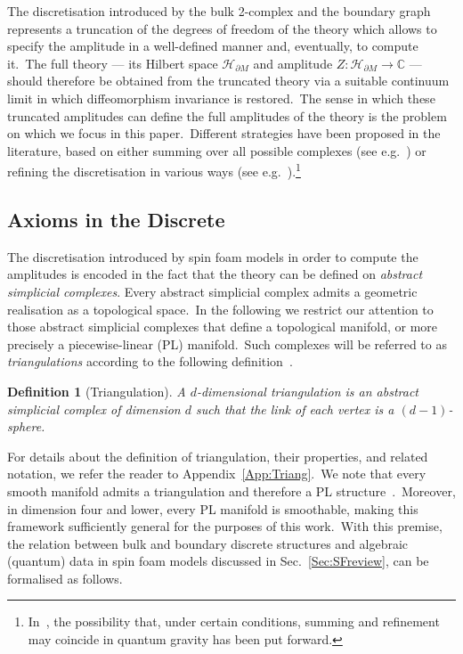 \documentclass[11pt]{article}
\newtheorem{definition}{Definition}[section]
\theoremstyle{definition}
\numberwithin{equation}{section}
\begin{document}
    \smallskip
    
    The discretisation introduced by the bulk 2-complex and the boundary graph represents a truncation of the degrees of freedom of the theory which allows to specify the amplitude in a well-defined manner and, eventually, to compute it.~The full theory --- its Hilbert space $\mathcal H_{\partial M}$ and amplitude $Z \colon \mathcal{H}_{\partial M} \to \mathbb{C}$ --- should therefore be obtained from the truncated theory via a suitable continuum limit in which diffeomorphism invariance is restored.~The sense in which these truncated amplitudes can define the full amplitudes of the theory is the problem on which we focus in this paper.~Different strategies have been proposed in the literature, based on either summing over all possible complexes (see e.g.~\cite{Reisenberger_Rovelli_1997,Reisenberger:2000fy,Oriti:2014yla,Han:2025emp}) or refining the discretisation in various ways (see e.g.~\cite{Rovelli:2011eq,Rovelli_Smerlak_2012, Dittrich:2012jq,Dittrich:2013xwa,Dittrich:2014ala,Asante_Dittrich_Steinhaus_2023,Rovelli_2022}).\footnote{In~\cite{Rovelli_Smerlak_2012}, the possibility that, under certain conditions, summing and refinement may coincide in quantum gravity has been put forward.}
    
\subsection{Axioms in the Discrete}\label{Sec:truncatedaxioms}

The discretisation introduced by spin foam models in order to compute the amplitudes is encoded in the fact that the theory can be defined on \emph{abstract simplicial complexes}. Every abstract simplicial complex admits a geometric realisation as a topological space.~In the following we restrict our attention to those abstract simplicial complexes that define a topological manifold, or more precisely a piecewise-linear (PL) manifold.~Such complexes will be referred to as \emph{triangulations} according to the following definition~\cite{Hudson_1969}.
\begin{definition}[Triangulation]
A $d$-dimensional triangulation is an abstract simplicial complex of dimension $d$ such that the link of each vertex is a $(d-1)$-sphere.
\end{definition}
For details about the definition of triangulation, their properties, and related notation, we refer the reader to Appendix~\ref{App:Triang}.~We note that every smooth manifold admits a triangulation and therefore a PL structure~\cite{Whitehead_1940}.~Moreover, in dimension four and lower, every PL manifold is smoothable, making this framework sufficiently general for the purposes of this work.~With this premise, the relation between bulk and boundary discrete structures and algebraic (quantum) data in spin foam models discussed in Sec.~\ref{Sec:SFreview}, can be formalised as follows.
\end{document}
